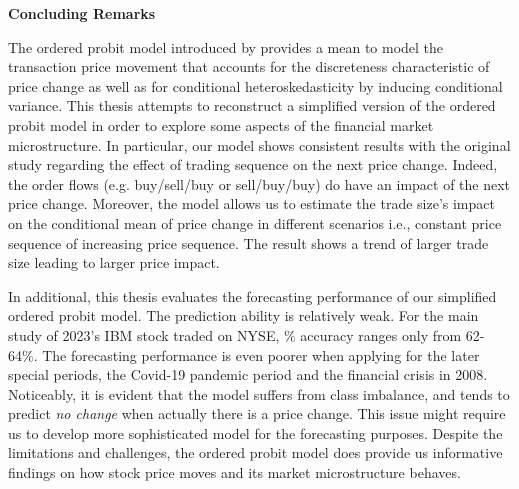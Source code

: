 {\noindent\bfseries Concluding Remarks }

The ordered probit model introduced by \citet{hausman1992} provides a mean to model the transaction price movement that accounts for the discreteness characteristic of price change as well as for conditional heteroskedasticity by inducing conditional variance. This thesis attempts to reconstruct a simplified version of the ordered probit model in order to explore some aspects of the financial market microstructure. In particular, our model shows consistent results with the original study regarding the effect of trading sequence on the next price change. Indeed, the order flows (e.g. buy/sell/buy or sell/buy/buy) do have an impact of the next price change. Moreover, the model allows us to estimate the trade size's impact on the conditional mean of price change in different scenarios i.e., constant price sequence of increasing price sequence. The result shows a trend of larger trade size leading to larger price impact.

In additional, this thesis evaluates the forecasting performance of our simplified ordered probit model. The prediction ability is relatively weak. For the main study of 2023's IBM stock traded on NYSE, \% accuracy ranges only from 62-64\%. The forecasting performance is even poorer when applying for the later special periods, the Covid-19 pandemic period and the financial crisis in 2008. Noticeably, it is evident that the model suffers from class imbalance, and tends to predict \textit{no change} when actually there is a price change. This issue might require us to develop more sophisticated model for the forecasting purposes. Despite the limitations and challenges, the ordered probit model does provide us informative findings on how stock price moves and its market microstructure behaves.